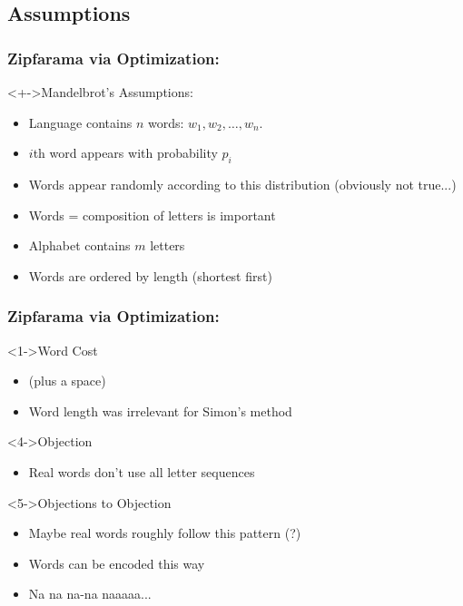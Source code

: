 \subsection{Assumptions}

\begin{frame}
  \frametitle{Zipfarama via Optimization:}

  \begin{block}<+->{Mandelbrot's Assumptions:}
    \begin{itemize}
    \item<+-> 
      Language contains $n$ words: $w_1, w_2, \ldots, w_n$.
    \item<+-> 
      $i$th word appears with probability $p_i$
    \item<+-> 
      Words appear randomly according to this distribution (obviously not true...)
    \item<+-> 
      Words = composition of letters is important
    \item<+-> 
      Alphabet contains $m$ letters
    \item<+-> 
      Words are ordered by length (shortest first)
    \end{itemize}
  \end{block}

  \end{frame}

\begin{frame}
  \frametitle{Zipfarama via Optimization:}

  \begin{block}<1->{Word Cost}
    \begin{itemize}
    \item<2->  (plus a space)
    \item<3-> Word length was irrelevant for Simon's method
    \end{itemize}
  \end{block}

\begin{block}<4->{Objection}
  \begin{itemize}
  \item<4-> Real words don't use all letter sequences
  \end{itemize}
\end{block}

\begin{block}<5->{Objections to Objection}
  \begin{itemize}
  \item<5-> Maybe real words roughly follow this pattern (?)
  \item<6-> Words can be encoded this way
  \item<7-> Na na na-na naaaaa...
  \end{itemize}
\end{block}


\end{frame}

